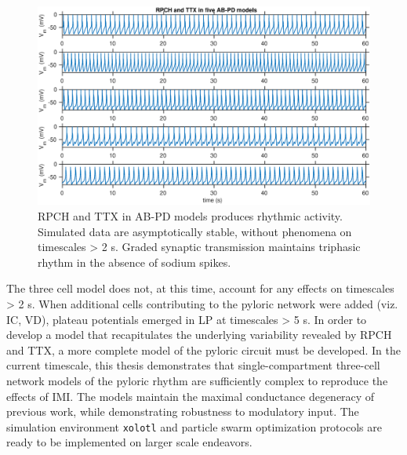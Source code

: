 \begin{figure}[h]
	\centering
	\includegraphics[width=1.0\linewidth]{gfx/RPCH_TTX}
	\caption[RPCH and TTX in optimized AB-PD models]{\acs{RPCH} and \acs{TTX} in \acs{AB}-\acs{PD} models produces rhythmic activity. Simulated data are asymptotically stable, without phenomena on timescales > 2 s. Graded synaptic transmission maintains triphasic rhythm in the absence of sodium spikes.}
	\label{fig:rpchttx}
\end{figure}

\FloatBarrier

The three cell model does not, at this time, account for any effects on timescales > 2 s. When additional cells contributing to the pyloric network were added (viz. \acs{IC}, \acs{VD}), plateau potentials emerged in \acs{LP} at timescales > 5 s. In order to develop a model that recapitulates the underlying variability revealed by \acs{RPCH} and \acs{TTX}, a more complete model of the pyloric circuit must be developed. In the current timescale, this thesis demonstrates that single-compartment three-cell network models of the pyloric rhythm are sufficiently complex to reproduce the effects of \acs{IMI}. The models maintain the maximal conductance degeneracy of previous work, while demonstrating robustness to modulatory input. The simulation environment \texttt{xolotl} and particle swarm optimization protocols are ready to be implemented on larger scale endeavors.




